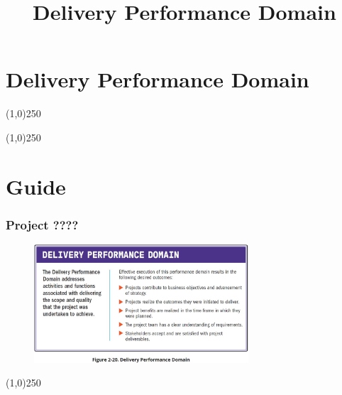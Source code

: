 



%
\title[Project Management \& BIM]{Delivery Performance Domain}



%
\usetikzlibrary{arrows}



\newpage




\thispagestyle{empty}
\tableofcontents
\newpage
\section{Delivery Performance Domain}


\begin{frame}
\titlepage
\end{frame}\begin{center}\line(1,0){250}\end{center}
%
%
\begin{center}\line(1,0){250}\end{center}




\section{Guide}


\begin{frame}
\frametitle{Project ????}
 \begin{figure}
    \centering
        \includegraphics[width = 8cm]{../images/guide/Fig2-20.jpg}
    \label{guidefig:2-20}
 \end{figure}
\end{frame}
\begin{center}\line(1,0){250}\end{center}


